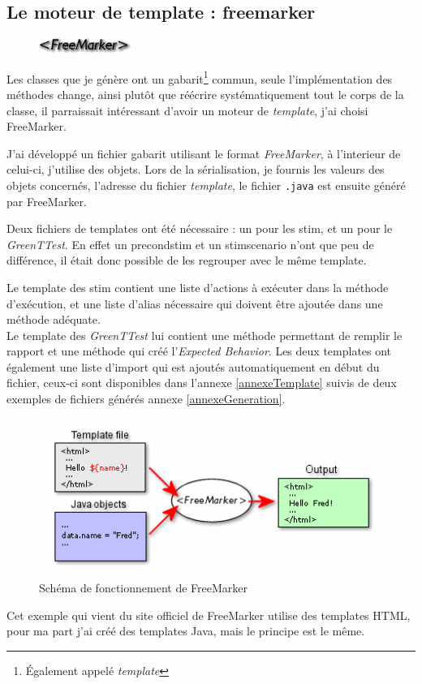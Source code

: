 		\subsection{Le moteur de template : freemarker}
		\begin{figure}
			\includegraphics[width=3cm]{contents/images/FreeMarker.png}
		\end{figure}
		Les classes que je génère ont un gabarit\footnote{\'Egalement appelé \textit{template}} commun, seule l'implémentation des méthodes change, ainsi plutôt que réécrire systématiquement tout le corps de la classe, il parraissait intéressant d'avoir un moteur de \textit{template}, j'ai choisi FreeMarker.

		J'ai développé un fichier gabarit utilisant le format \textit{FreeMarker}, à l'interieur de celui-ci, j'utilise des objets. Lors de la sérialisation, je fournis les valeurs des objets concernés, l'adresse du fichier \textit{template}, le fichier \texttt{.java} est ensuite généré par FreeMarker.

		Deux fichiers de templates ont été nécessaire : un pour les stim, et un pour le \textit{GreenTTest}. En effet un precondstim et un stimscenario n'ont que peu de différence, il était donc possible de les regrouper avec le même template.

		Le template des stim contient une liste d'actions à exécuter dans la méthode d'exécution, et une liste d'alias nécessaire qui doivent être ajoutée dans une méthode adéquate. \\
		Le template des \textit{GreenTTest} lui contient une méthode permettant de remplir le rapport et une méthode qui créé l'\textit{Expected Behavior}.
		Les deux templates ont également une liste d'import qui est ajoutés automatiquement en début du fichier, ceux-ci sont disponibles dans l'annexe \ref{annexeTemplate} suivis de deux exemples de fichiers générés annexe \ref{annexeGeneration}.

	
		\begin{figure}[H]
		\centering
		\includegraphics[width=12cm]{contents/images/FreeMarkerSchema.png}
		\caption{Schéma de fonctionnement de FreeMarker}
		\end{figure}
		\begin{remarque}
		Cet exemple qui vient du site officiel de FreeMarker utilise des templates HTML, pour ma part j'ai créé des templates Java, mais le principe est le même.
		\end{remarque}
